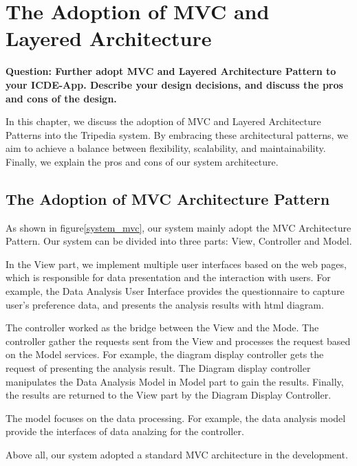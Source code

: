 \documentclass[conference]{IEEEtran}
\begin{document}
\section{\textbf{The Adoption of MVC and Layered Architecture}}

\textbf{Question: Further adopt MVC and Layered Architecture Pattern to your ICDE-App. Describe your design decisions, and discuss the pros and cons of the design.}

In this chapter, we discuss the adoption of MVC and Layered Architecture Patterns into the Tripedia system. By embracing these architectural patterns, we aim to achieve a balance between flexibility, scalability, and maintainability. Finally, we explain the pros and cons of our system architecture.


\subsection{\textbf{The Adoption of MVC Architecture Pattern}}

As shown in figure\ref{system_mvc}, our system mainly adopt the MVC Architecture Pattern. Our system can be divided into three parts: View, Controller and Model.

In the View part, we implement multiple user interfaces based on the web pages, which is responsible for data presentation and the interaction with users. For example, the Data Analysis User Interface provides the questionnaire to capture user's preference data, and presents the analysis results with html diagram.

The controller worked as the bridge between the View and the Mode. The controller gather the requests sent from the View and processes the request based on the Model services. For example, the diagram display controller gets the request of presenting the analysis result. The Diagram display controller manipulates the Data Analysis Model in Model part to gain the results. Finally, the results are returned to the View part by the Diagram Display Controller.

The model focuses on the data processing. For example, the data analysis model provide the interfaces of data analzing for the controller. 

Above all, our system adopted a standard MVC architecture in the development.
\end{document}
